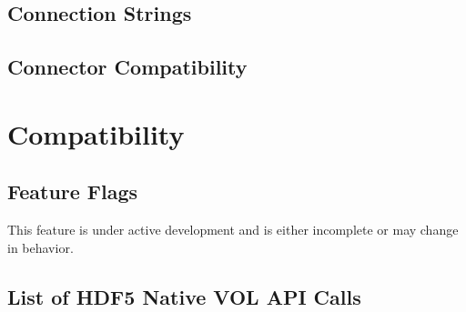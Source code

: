 \subsection{Connection Strings}
\subsection{Connector Compatibility}

\section{Compatibility}
\subsection{Feature Flags}
\begin{tcolorbox}[colback=yellow!10!white,colframe=red!75!black,title=PRELIMINARY]
    This feature is under active development and is either incomplete or may change in behavior.
\end{tcolorbox}
\subsection{List of HDF5 Native VOL API Calls}

